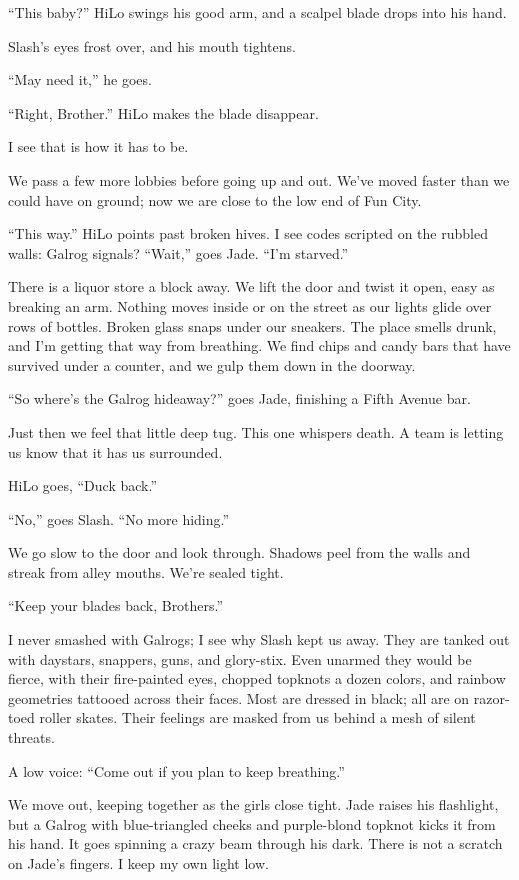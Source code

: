 ``This baby?'' HiLo swings his good arm, and a scalpel blade drops into his hand.

Slash's eyes frost over, and his mouth tightens.

``May need it,'' he goes.

``Right, Brother.'' HiLo makes the blade disappear.

I see that is how it has to be.

We pass a few more lobbies before going up and out. We've moved faster than we could have on ground; now we are close to the low end of Fun City.

``This way.'' HiLo points past broken hives. I see codes scripted on the rubbled walls: Galrog signals?
``Wait,'' goes Jade. ``I'm starved.''

There is a liquor store a block away. We lift the door and twist it open, easy as breaking an arm. Nothing moves inside or on the street as our lights glide over rows of bottles. Broken glass snaps under our sneakers. The place smells drunk, and I'm getting that way from breathing. We find chips and candy bars that have survived under a counter, and we gulp them down in the doorway.

``So where's the Galrog hideaway?'' goes Jade, finishing a Fifth Avenue bar.

Just then we feel that little deep tug. This one whispers death. A team is letting us know that it has us surrounded.

HiLo goes, ``Duck back.''

``No,'' goes Slash. ``No more hiding.''

We go slow to the door and look through. Shadows peel from the walls and streak from alley mouths. We're sealed tight.

``Keep your blades back, Brothers.''

I never smashed with Galrogs; I see why Slash kept us away. They are tanked out with daystars, snappers, guns, and glory-stix. Even unarmed they would be fierce, with their fire-painted eyes, chopped topknots a dozen colors, and rainbow geometries tattooed across their faces. Most are dressed in black; all are on razor-toed roller skates.
Their feelings are masked from us behind a mesh of silent threats.

A low voice: ``Come out if you plan to keep breathing.''

We move out, keeping together as the girls close tight. Jade raises his flashlight, but a Galrog with blue-triangled cheeks and purple-blond topknot kicks it from his hand. It goes spinning a crazy beam through his dark. There is not a scratch on Jade's fingers. I keep my own light low.

